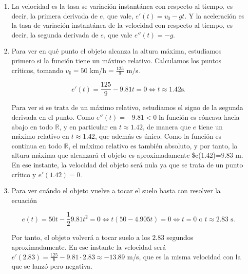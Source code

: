 \documentclass[
  spanish,
  a4paper,
]{scrreport}
\theoremstyle{definition}
\theoremstyle{remark}
\begin{document}
\begin{tcolorbox}[enhanced jigsaw, arc=.35mm, bottomrule=.15mm, bottomtitle=1mm, breakable, colback=white, colbacktitle=quarto-callout-tip-color!10!white, colframe=quarto-callout-tip-color-frame, coltitle=black, left=2mm, leftrule=.75mm, opacityback=0, opacitybacktitle=0.6, rightrule=.15mm, title=\textcolor{quarto-callout-tip-color}{\faLightbulb}\hspace{0.5em}{Solución}, titlerule=0mm, toprule=.15mm, toptitle=1mm]

\begin{enumerate}
\def\labelenumi{\alph{enumi}.}
\item
  La velocidad es la tasa se variación instantánea con respecto al
  tiempo, es decir, la primera derivada de \(e\), que vale,
  \(e'(t) = v_0-gt\). Y la aceleración es la tasa de variación
  instantánea de la velocidad con respecto al tiempo, es decir, la
  segunda derivada de \(e\), que vale \(e''(t)=-g\).
\item
  Para ver en qué punto el objeto alcanza la altura máxima, estudiamos
  primero si la función tiene un máximo relativo. Calculamos los puntos
  críticos, tomando \(v_0 = 50\) km/h = \(\frac{125}{9}\) m/s.

  \[
   e'(t) = \frac{125}{9}-9.81t = 0 \Leftrightarrow t \approx 1.42 \mbox{s}.
   \]

  Para ver si se trata de un máximo relativo, estudiamos el signo de la
  segunda derivada en el punto. Como \(e''(t)=-9.81<0\) la función es
  cóncava hacia abajo en todo \(\mathbb{R}\), y en particular en
  \(t\approx 1.42\), de manera que \(e\) tiene un máximo relativo en
  \(t\approx 1.42\), que además es único. Como la función es continua en
  todo \(\mathbb{R}\), el máximo relativo es también absoluto, y por
  tanto, la altura máxima que alcanzará el objeto es aproximadamente
  \$e(1.42)=\(9.83\) m. En ese instante, la velocidad del objeto será
  nula ya que se trata de un punto crítico y \(e'(1.42)=0\).
\item
  Para ver cuándo el objeto vuelve a tocar el suelo basta con resolver
  la ecuación

  \[
   e(t)=50t-\frac{1}{2}9.81t^2 =0 \Leftrightarrow t(50-4.905t) = 0 \Leftrightarrow t=0 \mbox{ o } t\approx 2.83 \mbox{ s}.
   \]

  Por tanto, el objeto volverá a tocar suelo a los \(2.83\) segundos
  aproximadamente. En ese instante la velocidad será
  \(e'(2.83)=\frac{125}{9}-9.81\cdot 2.83 \approx -13.89\) m/s, que es
  la misma velocidad con la que se lanzó pero negativa.
\end{enumerate}

\end{tcolorbox}
\end{document}
